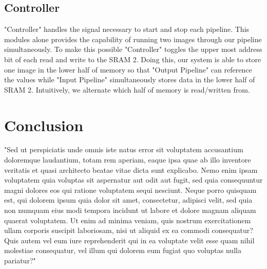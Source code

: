 \documentclass[12pt]{IEEEtran}
\begin{document}
\subsection*{Controller}
\begin{flushleft}
"Controller" handles the signal necessary to start and stop each pipeline. This modules alone provides the capability of running two images through our pipeline simultaneously. To make this possible "Controller" toggles the upper most address bit of each read and write to the SRAM 2. Doing this, our system is able to store one image in the lower half of memory so that "Output Pipeline" can reference the values while "Input Pipeline" simultaneously stores data in the lower half of SRAM 2. Intuitively, we alternate which half of memory is read/written from.
\end{flushleft}

\section{Conclusion}
\begin{flushleft}

"Sed ut perspiciatis unde omnis iste natus error sit voluptatem accusantium doloremque laudantium, totam rem aperiam, eaque ipsa quae ab illo inventore veritatis et quasi architecto beatae vitae dicta sunt explicabo. Nemo enim ipsam voluptatem quia voluptas sit aspernatur aut odit aut fugit, sed quia consequuntur magni dolores eos qui ratione voluptatem sequi nesciunt. Neque porro quisquam est, qui dolorem ipsum quia dolor sit amet, consectetur, adipisci velit, sed quia non numquam eius modi tempora incidunt ut labore et dolore magnam aliquam quaerat voluptatem. Ut enim ad minima veniam, quis nostrum exercitationem ullam corporis suscipit laboriosam, nisi ut aliquid ex ea commodi consequatur? Quis autem vel eum iure reprehenderit qui in ea voluptate velit esse quam nihil molestiae consequatur, vel illum qui dolorem eum fugiat quo voluptas nulla pariatur?"
\end{flushleft}
\end{document}
